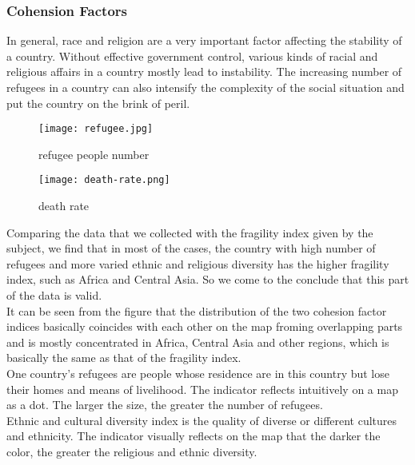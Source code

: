 \documentclass{mcmthesis}
\begin{document}
\subsubsection{Cohension Factors}
In general, race and religion are a very important factor affecting the stability of a country. Without effective government control, various kinds of racial and religious affairs in a country mostly lead to instability. The increasing number of refugees in a country can also intensify the complexity of the social situation and put the country on the brink of peril.\\
\begin{figure}[h]
  \centering
  \begin{minipage}[h]{0.48\textwidth}
  \centering
  \texttt{[image: refugee.jpg]}
  \caption{refugee people number}
  \end{minipage}
  \begin{minipage}[h]{0.48\textwidth}
  \centering
  \texttt{[image: death-rate.png]}
  \caption{death rate}
  \end{minipage}
\end{figure}
Comparing the data that we collected with the fragility index given by the subject, we find that in most of the cases, the country with high number of refugees and more varied ethnic and religious diversity has the higher fragility index, such as Africa and Central Asia. So we come to the conclude that this part of the data is valid.\\
It can be seen from the figure that the distribution of the two cohesion factor indices basically coincides with each other on the map froming overlapping parts and is mostly concentrated in Africa, Central Asia and other regions, which is basically the same as that of the fragility index.\\
One country's refugees are people whose residence are in this country but lose their homes and means of livelihood. The indicator reflects intuitively on a map as a dot. The larger the size, the greater the number of refugees.\\
Ethnic and cultural diversity index is the quality of diverse or different cultures and ethnicity. The indicator visually reflects on the map that the darker the color, the greater the religious and ethnic diversity.
\end{document}
